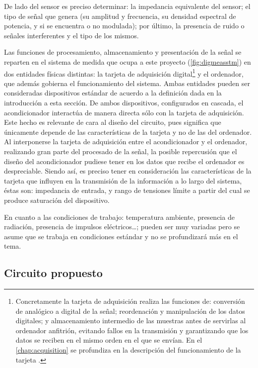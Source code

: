 De lado del sensor es preciso determinar: la impedancia equivalente del
sensor; el tipo de señal que genera (su amplitud y frecuencia, su densidad
espectral de potencia, y si se encuentra o no modulada); por último, la
presencia de ruido o señales interferentes y el tipo de los mismos.

Las funciones de procesamiento, almacenamiento y presentación de la señal
se reparten en el sistema de medida que ocupa a este proyecto
(\vref{fig:digmeasstm}) en dos entidades físicas distintas: la tarjeta de
adquisición digital\footnote{Concretamente la tarjeta de adquisición
realiza las funciones de: conversión de analógico a digital de la señal;
reordenación y manipulación de los datos digitales; y almacenamiento
intermedio de las muestras antes de servirlas al ordenador anfitrión,
evitando fallos en la transmisión y garantizando que los datos se reciben
en el mismo orden en el que se envían. En el \cref{chap:acquisition} se
profundiza en la descripción del funcionamiento de la tarjeta \kpci{}.} y
el ordenador, que además gobierna el funcionamiento del sistema. Ambas
entidades pueden ser consideradas dispositivos estándar de acuerdo a la
definición dada en la introducción a esta sección. De ambos dispositivos,
configurados en cascada, el acondicionador interactúa de manera directa
sólo con la tarjeta de adquisición. Este hecho es relevante de cara al
diseño del circuito, pues significa que únicamente depende de las
características de la tarjeta y no de las del ordenador. Al interponerse la
tarjeta de adquisición entre el acondicionador y el ordenador, realizando
gran parte del procesado de la señal, la posible repercusión que el diseño
del acondicionador pudiese tener en los datos que recibe el ordenador es
despreciable. Siendo así, es preciso tener en consideración las
características de la tarjeta que influyen en la transmisión de la
información a lo largo del sistema, éstas son: impedancia de entrada, y
rango de tensiones límite a partir del cual se produce saturación del
dispositivo.

En cuanto a las condiciones de trabajo: temperatura ambiente, presencia de
radiación, presencia de impulsos eléctricos\dots; pueden ser muy variadas
pero se asume que se trabaja en condiciones estándar y no se profundizará
más en el tema.


\subsection{Circuito propuesto}

